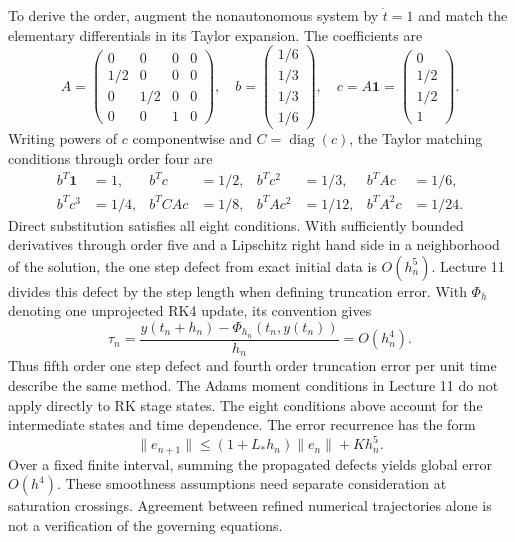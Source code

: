 To derive the order, augment the nonautonomous system by $\dot t=1$ and
match the elementary differentials in its Taylor expansion. The coefficients are
\[
A=\begin{pmatrix}0&0&0&0\\1/2&0&0&0\\0&1/2&0&0\\0&0&1&0\end{pmatrix},
\quad b=\begin{pmatrix}1/6\\1/3\\1/3\\1/6\end{pmatrix},
\quad c=A\mathbf1=\begin{pmatrix}0\\1/2\\1/2\\1\end{pmatrix}.
\]
Writing powers of $c$ componentwise and $C=\operatorname{diag}(c)$,
the Taylor matching conditions through order four are
\begin{align}
b^T\mathbf1&=1,&b^Tc&=1/2,&b^Tc^2&=1/3,&b^TAc&=1/6,\\
b^Tc^3&=1/4,&b^TCAc&=1/8,&b^TAc^2&=1/12,&b^TA^2c&=1/24.
\end{align}
Direct substitution satisfies all eight conditions. With sufficiently bounded
derivatives through order five and a Lipschitz right hand side in a neighborhood
of the solution, the one step defect from exact initial data is $O(h_n^5)$.
Lecture 11 \cite{goza11} divides this defect by the step length when defining truncation
error. With $\Phi_h$ denoting one unprojected RK4 update, its convention gives
\[
\tau_n=\frac{y(t_n+h_n)-\Phi_{h_n}(t_n,y(t_n))}{h_n}=O(h_n^4).
\]
Thus fifth order one step defect and fourth order truncation error per unit
time describe the same method. The Adams moment conditions in Lecture 11
do not apply directly to RK stage states. The eight conditions above account
for the intermediate states and time dependence.
The error recurrence has the form
\[
\|e_{n+1}\|\leq(1+L_*h_n)\|e_n\|+K h_n^5.
\]
Over a fixed finite interval, summing the propagated defects yields global error
$O(h^4)$. These smoothness assumptions need separate consideration at saturation
crossings. Agreement between refined numerical trajectories alone is not a
verification of the governing equations.

